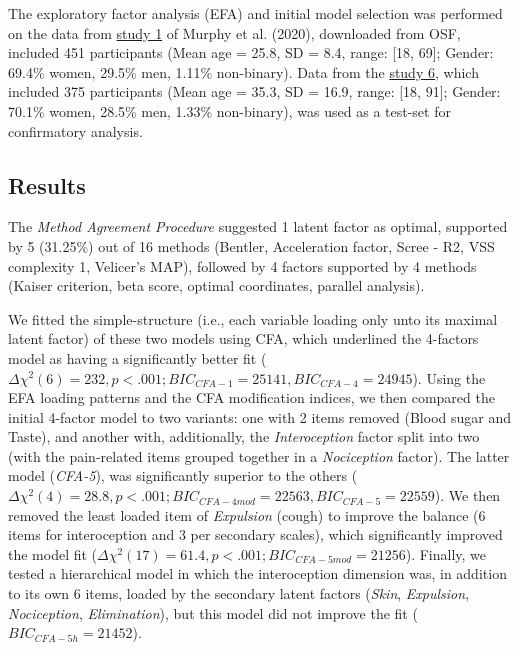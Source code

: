 \documentclass[
  man,floatsintext]{apa6}
\begin{document}
The exploratory factor analysis (EFA) and initial model selection was performed on the data from \href{https://osf.io/3m5nh/?view_only=a68051df4abe4ecb992f22dc8c17f769}{study 1} of Murphy et al. (2020), downloaded from OSF, included 451 participants (Mean age = 25.8, SD = 8.4, range: {[}18, 69{]}; Gender: 69.4\% women, 29.5\% men, 1.11\% non-binary). Data from the \href{https://osf.io/3m5nh/?view_only=a68051df4abe4ecb992f22dc8c17f769}{study 6}, which included 375 participants (Mean age = 35.3, SD = 16.9, range: {[}18, 91{]}; Gender: 70.1\% women, 28.5\% men, 1.33\% non-binary), was used as a test-set for confirmatory analysis.

\hypertarget{results}{%
\subsection{Results}\label{results}}

The \emph{Method Agreement Procedure} suggested 1 latent factor as optimal, supported by 5 (31.25\%) out of 16 methods (Bentler, Acceleration factor, Scree - R2, VSS complexity 1, Velicer's MAP), followed by 4 factors supported by 4 methods (Kaiser criterion, beta score, optimal coordinates, parallel analysis).

We fitted the simple-structure (i.e., each variable loading only unto its maximal latent factor) of these two models using CFA, which underlined the 4-factors model as having a significantly better fit (\(\Delta \chi^2(6) = 232, p < .001; BIC_{CFA-1} = 25141, BIC_{CFA-4} = 24945\)). Using the EFA loading patterns and the CFA modification indices, we then compared the initial 4-factor model to two variants: one with 2 items removed (Blood sugar and Taste), and another with, additionally, the \emph{Interoception} factor split into two (with the pain-related items grouped together in a \emph{Nociception} factor). The latter model (\emph{CFA-5}), was significantly superior to the others (\(\Delta \chi^2(4) = 28.8, p < .001; BIC_{CFA-4mod} = 22563, BIC_{CFA-5} = 22559\)). We then removed the least loaded item of \emph{Expulsion} (cough) to improve the balance (6 items for interoception and 3 per secondary scales), which significantly improved the model fit (\(\Delta \chi^2(17) = 61.4, p < .001; BIC_{CFA-5mod} = 21256\)). Finally, we tested a hierarchical model in which the interoception dimension was, in addition to its own 6 items, loaded by the secondary latent factors (\emph{Skin}, \emph{Expulsion}, \emph{Nociception}, \emph{Elimination}), but this model did not improve the fit (\(BIC_{CFA-5h} = 21452\)).
\end{document}
